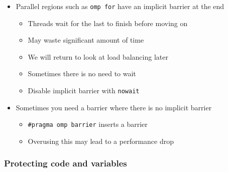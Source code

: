 \begin{itemize}
\itemsep1pt\parskip0pt
\item
  Parallel regions such as \texttt{omp for} have an implicit barrier at
  the end

  \begin{itemize}
  \itemsep1pt\parskip0pt
  \item
    Threads wait for the last to finish before moving on
  \item
    May waste significant amount of time
  \item
    We will return to look at load balancing later
  \item
    Sometimes there is no need to wait
  \item
    Disable implicit barrier with \texttt{nowait}
  \end{itemize}
\item
  Sometimes you need a barrier where there is no implicit barrier

  \begin{itemize}
  \itemsep1pt\parskip0pt
  \item
    \texttt{\#pragma omp barrier} inserts a barrier
  \item
    Overusing this may lead to a performance drop
  \end{itemize}
\end{itemize}

\subsubsection{Protecting code and
variables}\label{protecting-code-and-variables}


